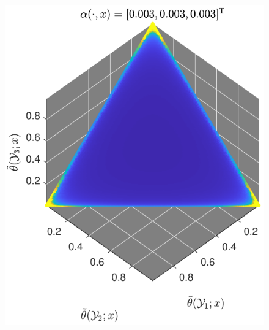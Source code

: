 \documentclass{beamer}
\begin{document}
\begin{frame}
\begin{columns}[T]
\begin{column}{.4\linewidth}
\begin{figure}
\centering
\includegraphics[width=0.5\linewidth]{P_theta_highVar.pdf}
\label{fig:P_theta_highVar}
\end{figure}

\end{column}

\end{columns}







\end{frame}
\end{document}
